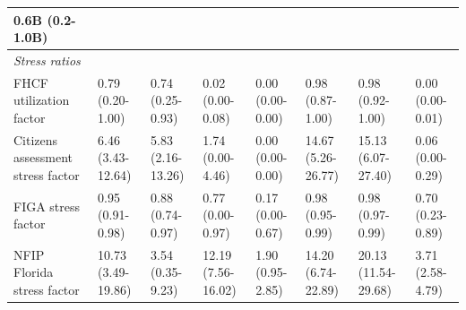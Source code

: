 \documentclass[fleqn,10pt]{wlscirep}
\begin{document}
\begin{landscape}
\begin{table}[htb!]
{\begin{tabular}{@{}llllllll@{}}
  0.6B (0.2-1.0B) \\
\midrule
\multicolumn{8}{l}{\textit{Stress ratios}} \\
FHCF utilization factor &
  0.79 (0.20-1.00) &
  0.74 (0.25-0.93) &
  0.02 (0.00-0.08) &
  0.00 (0.00-0.00) &
  0.98 (0.87-1.00) &
  0.98 (0.92-1.00) &
  0.00 (0.00-0.01) \\
Citizens assessment stress factor &
  6.46 (3.43-12.64) &
  5.83 (2.16-13.26) &
  1.74 (0.00-4.46) &
  0.00 (0.00-0.00) &
  14.67 (5.26-26.77) &
  15.13 (6.07-27.40) &
  0.06 (0.00-0.29) \\
FIGA stress factor &
  0.95 (0.91-0.98) &
  0.88 (0.74-0.97) &
  0.77 (0.00-0.97) &
  0.17 (0.00-0.67) &
  0.98 (0.95-0.99) &
  0.98 (0.97-0.99) &
  0.70 (0.23-0.89) \\
NFIP Florida stress factor &
  10.73 (3.49-19.86) &
  3.54 (0.35-9.23) &
  12.19 (7.56-16.02) &
  1.90 (0.95-2.85) &
  14.20 (6.74-22.89) &
  20.13 (11.54-29.68) &
  3.71 (2.58-4.79) \\
\bottomrule

\end{tabular}%
}
\end{table}
\end{landscape}
\end{document}
